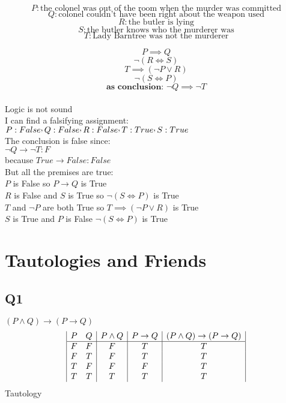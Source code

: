 \documentclass[a4paper,12pt]{article}
\newcommand{\CommaPunct}{\mathpunct{\raisebox{0.5ex}{,}}}
\begin{document}
\[
P: \text{the colonel was out of the room when the murder was committed}  
\]
\[
Q: \text{colonel couldn't have been right about the weapon used} 
\]
\[
R: \text{the butler is lying} 
\]
\[
S: \text{the butler knows who the murderer was}
\]
\[
T: \text{Lady Barntree was not the murderer} 
\]

\begin{equation} 
P \implies Q 
\end{equation}
\begin{equation} 
\neg(R \iff S)
\end{equation}
\begin{equation} 
T \implies (\neg P \vee R)
\end{equation}
\begin{equation} 
\neg(S \iff P)
\end{equation}
\begin{equation} 
\textbf{as conclusion: } \neg Q \implies \neg T
\end{equation}\\
Logic is not sound\\
I can find a falsifying assignment:\\
$P:False \CommaPunct Q:False \CommaPunct R:False\CommaPunct T:True \CommaPunct S:True$\\
The conclusion is false since:\\
$\lnot Q \rightarrow \lnot T : F$\\
because $True \rightarrow False : False$\\
But all the premises are true:\\
$P$ is False so $P \rightarrow Q$ is True\\
$R$ is False and $S$ is True so $\neg(S \iff P)$ is True\\
$T$ and $\lnot P$ are both True so $T \implies (\neg P \vee R)$ is True\\
$S$ is True and $P$ is False $\neg(S \iff P)$ is True\\
\pagebreak
\section{Tautologies and Friends}
\subsection{Q1}
$(P \wedge Q) \rightarrow (P \rightarrow Q)$\\

\begin{displaymath}
\begin {array} {|c c |c|c|c|}
P & Q & P \wedge Q &P \rightarrow Q & (P \wedge Q) \rightarrow (P \rightarrow Q)\\
\hline
F & F & F & T & T \\
F & T & F & T & T \\
T & F & F & F & T \\
T & T & T & T & T \\
\end{array}
\end{displaymath}
Tautology\\
\end{document}
